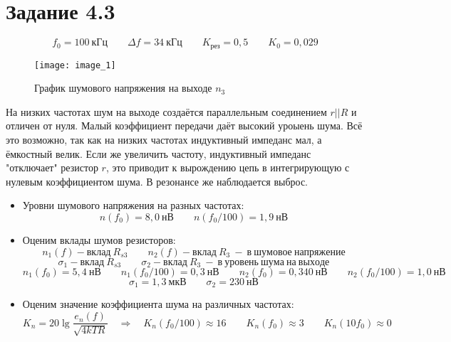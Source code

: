 \section*{Задание 4.3}
\[
	f_0 = 100 \ кГц \quad \quad \Delta f = 34 \ кГц \quad \quad K_{рез} = 0,5 \quad \quad K_{0} = 0,029
\]

\begin{figure}[h!]
	\centering
	\texttt{[image: image\_1]}
	\caption{График шумового напряжения на выходе $ n_3 $}
	\label{fig:image_1}
\end{figure}

На низких частотах шум на выходе создаётся параллельным соединением $ r||R $ и отличен от нуля. Малый коэффициент передачи даёт высокий уроыень шума. Всё это возможно, так как на низких частотах индуктивный импеданс мал, а ёмкостный велик. Если же увеличить частоту, индуктивный импеданс "отключает" резистор $ r $, это приводит к вырождению цепь в интегрирующую с нулевым коэффициентом шума. В резонансе же наблюдается выброс. \\ 
\begin{itemize}
	\item Уровни шумового напряжения на разных частотах: 
		\[
		n(f_0) = 8,0 \ нВ \quad \quad n(f_0/100) = 1,9 \ нВ
		\]
	\item Оценим вклады шумов резисторов:
		\[
			n_1(f) - вклад \ R_{s3} \quad \quad n_2(f) - вклад \ R_{3} \ - \ в \ шумовое \ напряжение
		\]
		\[
			\sigma_1 - вклад \ R_{s3} \quad \quad \sigma_2 - вклад \ R_{3} \ - \ в \ уровень \ шума \ на \ выходе
		\]
		\[
			n_1(f_0) = 5,4 \ нВ \quad \quad n_1(f_0/100) = 0,3 \ нВ \quad \quad n_2(f_0) = 0,340 \ нВ \quad \quad n_2(f_0/100) = 1,0 \ нВ
		\]
		\[
			\sigma_1 = 1,3 \ мкВ \quad \quad \sigma_2 = 230 \ нВ
		\]
	\item Оценим значение коэффициента шума на различных частотах:
	\[
		K_n = 20 \lg \frac{e_n(f)}{\sqrt{4kTR}} \quad \Rightarrow \quad K_n(f_0/100) \approx 16 \quad \quad K_n(f_0) \approx 3 \quad \quad K_n(10f_0) \approx 0
	\]
\end{itemize}

\newpage 
